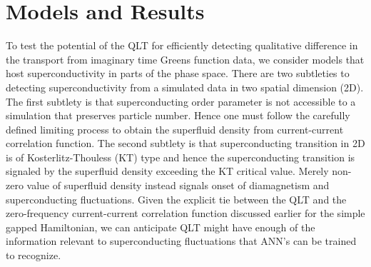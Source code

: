 \documentclass[amsmath,amssymb, aps, prl, twocolumn]{revtex4-1}
\begin{document}
\section{Models and Results}
To test the potential of the QLT for efficiently detecting qualitative difference in the transport from imaginary time Greens function data, we consider models that host superconductivity in parts of the phase space.
There are two subtleties to detecting superconductivity from a simulated data in two spatial dimension (2D). The first subtlety is that superconducting order parameter is not accessible to a simulation that preserves particle number. Hence one must follow the carefully defined limiting process to obtain the superfluid density from current-current correlation function\cite{Scalapino1993, Scalapino1992}. The second subtlety is that superconducting transition in 2D is of Kosterlitz-Thouless (KT) type and hence the superconducting transition is signaled by the superfluid density exceeding the KT critical value\cite{KT1973}. Merely non-zero value of superfluid density instead signals onset of diamagnetism and superconducting fluctuations. Given the explicit tie between the QLT and the zero-frequency current-current correlation function discussed earlier for the simple gapped Hamiltonian, we can anticipate QLT might have enough of the information relevant to superconducting fluctuations that ANN's can be trained to recognize.  

\end{document}
